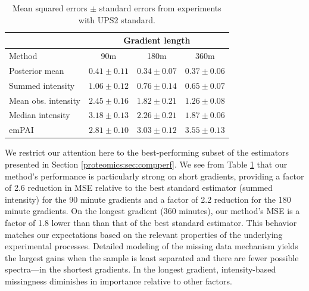 \begin{table}
\centering
\caption{Mean squared errors $\pm$ standard errors from experiments with UPS2 standard.
\label{proteomics:tab:UPS2 results}}
\begin{tabular}{l|ccc}
\hline
& \multicolumn{3}{c}{Gradient length} \\
  \hline
Method & 90m & 180m & 360m \\ 
  \hline
Posterior mean & $0.41 \pm 0.11$ & $0.34 \pm 0.07$ & $0.37 \pm 0.06$ \\ 
  Summed intensity & $1.06 \pm 0.12$ & $0.76 \pm 0.14$ & $0.65 \pm 0.07$ \\ 
  Mean obs. intensity & $2.45 \pm 0.16$ & $1.82 \pm 0.21$ & $1.26 \pm 0.08$ \\ 
  Median intensity & $3.18 \pm 0.13$ & $2.26 \pm 0.21$ & $1.87 \pm 0.06$ \\ 
  emPAI & $2.81 \pm 0.10$ & $3.03 \pm 0.12$ & $3.55 \pm 0.13$ \\ 
   \hline
\end{tabular}
\end{table}
\fi
%
We restrict our attention here to the best-performing subset of the estimators presented in Section \ref{proteomics:sec:compperf}.
We see from Table \ref{proteomics:tab:UPS2 results} that our method's performance is particularly strong on short gradients, providing a factor of 2.6 reduction in MSE relative to the best standard estimator (summed intensity) for the 90 minute gradients and a factor of 2.2 reduction for the 180 minute gradients.
On the longest gradient (360 minutes), our method's MSE is a factor of 1.8 lower than than that of the best standard estimator.
This behavior matches our expectations based on the relevant properties of the underlying experimental processes.
Detailed modeling of the missing data mechanism yields the largest gains when the sample is least separated and there are fewer possible spectra---in the shortest gradients.
In the longest gradient, intensity-based missingness diminishes in importance relative to other factors.

